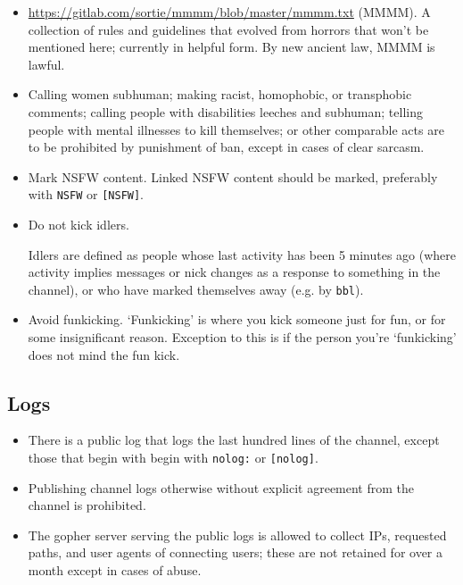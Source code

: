 \documentclass[11pt]{article}
\begin{document}
\begin{itemize}

\item \url{https://gitlab.com/sortie/mmmm/blob/master/mmmm.txt} (MMMM).
A collection of rules and guidelines that evolved from horrors that won't be mentioned here; currently in helpful form. By new ancient law, MMMM is lawful.

\item Calling women subhuman; making racist, homophobic, or transphobic
comments; calling people with disabilities leeches and subhuman;
telling people with mental illnesses to kill themselves; or other comparable acts
are to be prohibited by punishment of ban, except in cases of clear sarcasm.

\item Mark NSFW content. Linked NSFW content should be marked, preferably with \texttt{NSFW} or \texttt{[NSFW]}.

\item Do not kick idlers.

Idlers are defined as people whose last activity has been 5 minutes ago (where activity implies messages or nick changes as a response to something in the channel), or who have marked themselves away (e.g. by \texttt{bbl}).

\item Avoid funkicking.
`Funkicking' is where you kick someone just for fun, or for some insignificant reason. Exception to this is if the person you're `funkicking' does not mind the fun kick.

\end{itemize}

\subsection{Logs}

\begin{itemize}
\item There is a public log that logs the last hundred lines of the channel, except those that begin with
begin with \texttt{nolog:} or \texttt{[nolog]}.
\item Publishing channel logs otherwise without explicit agreement from the channel is prohibited.
\item The gopher server serving the public logs is allowed to collect IPs, requested paths, and user
agents of connecting users; these are not retained for over a month except in cases of abuse.
\end{itemize}
\end{document}
